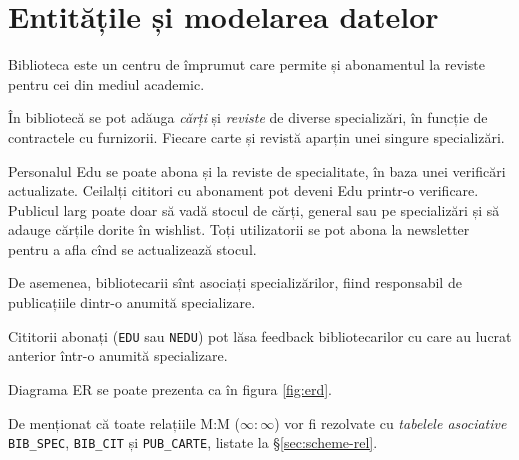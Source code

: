 
\section{Entitățile și modelarea datelor}
\label{sec:ent-model}

Biblioteca este un centru de împrumut care permite și abonamentul la reviste
pentru cei din mediul academic.

În bibliotecă se pot adăuga \emph{cărți} și \emph{reviste} de diverse
specializări, în funcție de contractele cu furnizorii. Fiecare
carte și revistă aparțin unei singure specializări.

Personalul Edu se poate abona și la reviste de specialitate, în baza
unei verificări actualizate. Ceilalți cititori cu abonament pot deveni
Edu printr-o verificare. Publicul larg poate doar să vadă stocul
de cărți, general sau pe specializări și să adauge cărțile dorite
în wishlist. Toți utilizatorii se pot abona la newsletter pentru a
afla cînd se actualizează stocul.

De asemenea, bibliotecarii sînt asociați specializărilor, fiind
responsabil de publicațiile dintr-o anumită specializare.

Cititorii abonați (\texttt{EDU} sau \texttt{NEDU}) pot lăsa feedback
bibliotecarilor cu care au lucrat anterior într-o anumită specializare.

Diagrama ER se poate prezenta ca în figura \ref{fig:erd}.

De menționat că toate relațiile M:M ($\infty : \infty$) vor fi rezolvate
cu \emph{tabelele asociative} \texttt{BIB\_SPEC}, \texttt{BIB\_CIT} și
\texttt{PUB\_CARTE}, listate la \S\ref{sec:scheme-rel}.

